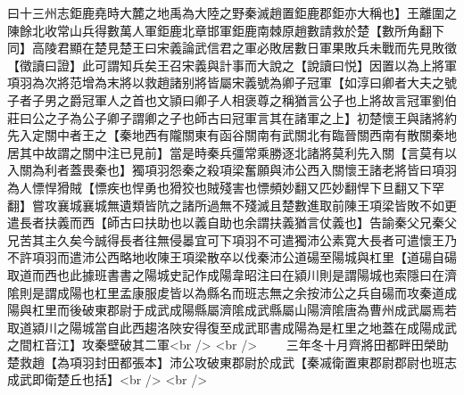 曰十三州志鉅鹿堯時大麓之地禹為大陸之野秦滅趙置鉅鹿郡鉅亦大稱也】王離圍之陳餘北收常山兵得數萬人軍鉅鹿北章邯軍鉅鹿南棘原趙數請救於楚【數所角翻下同】高陵君顯在楚見楚王曰宋義論武信君之軍必敗居數日軍果敗兵未戰而先見敗徵【徵讀曰證】此可謂知兵矣王召宋義與計事而大說之【說讀曰悦】因置以為上將軍項羽為次將范增為末將以救趙諸别將皆屬宋義號為卿子冠軍【如淳曰卿者大夫之號子者子男之爵冠軍人之首也文頴曰卿子人相褒尊之稱猶言公子也上將故言冠軍劉伯莊曰公之子為公子卿子謂卿之子也師古曰冠軍言其在諸軍之上】初楚懷王與諸將約先入定關中者王之【秦地西有隴關東有函谷關南有武關北有臨晉關西南有散關秦地居其中故謂之關中注已見前】當是時秦兵彊常乘勝逐北諸將莫利先入關【言莫有以入關為利者蓋畏秦也】獨項羽怨秦之殺項梁奮願與沛公西入關懷王諸老將皆曰項羽為人慓悍猾賊【慓疾也悍勇也猾狡也賊殘害也慓頻妙翻又匹妙翻悍下旦翻又下罕翻】嘗攻襄城襄城無遺類皆阬之諸所過無不殘滅且楚數進取前陳王項梁皆敗不如更遣長者扶義而西【師古曰扶助也以義自助也余謂扶義猶言仗義也】告諭秦父兄秦父兄苦其主久矣今誠得長者往無侵㬥宜可下項羽不可遣獨沛公素寛大長者可遣懷王乃不許項羽而遣沛公西略地收陳王項梁散卒以伐秦沛公道碭至陽城與杠里【道碭自碭取道而西也此據班書書之陽城史記作成陽韋昭注曰在潁川則是謂陽城也索隱曰在濟隂則是謂成陽也杠里孟康服䖍皆以為縣名而班志無之余按沛公之兵自碭而攻秦道成陽與杠里而後破東郡尉于成武成陽縣屬濟隂成武縣屬山陽濟隂唐為曹州成武屬焉若取道潁川之陽城當自此西趨洛陜安得復至成武耶書成陽為是杠里之地蓋在成陽成武之間杠音江】攻秦壁破其二軍<br />
<br />
　　三年冬十月齊將田都畔田榮助楚救趙【為項羽封田都張本】沛公攻破東郡尉於成武【秦㓕衛置東郡尉郡尉也班志成武即衛楚丘也括】<br />
<br />
